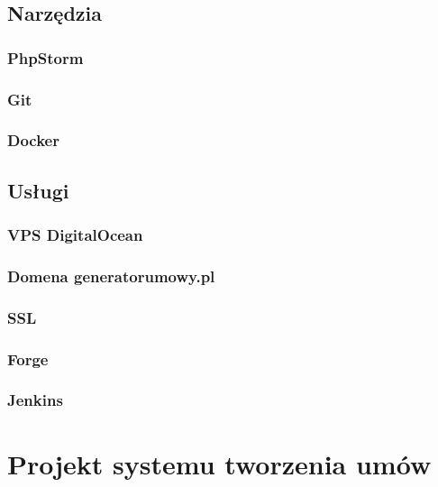 \documentclass[12pt]{report}
\begin{document}
        \section{Narzędzia}
            \subsection{PhpStorm}
                
            \subsection{Git}
                
            \subsection{Docker}
                
        \section{Usługi}
            \subsection{VPS DigitalOcean}
                
            \subsection{Domena generatorumowy.pl}
                
            \subsection{SSL}
                
            \subsection{Forge}
                
            \subsection{Jenkins}
                
    \chapter{Projekt systemu tworzenia umów}
\end{document}
